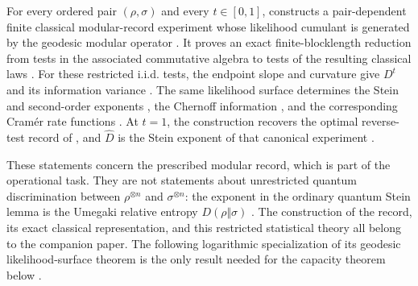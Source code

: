 \documentclass[11pt]{article}
\theoremstyle{remark}
\newcommand{\1}{\mathbbm{1}}
\begin{document}
For every ordered pair $(\rho,\sigma)$ and every $t\in[0,1]$, \cite{capel2026informationgeometry} constructs a pair-dependent finite classical
modular-record experiment whose likelihood cumulant is generated by
the geodesic modular operator
\cite[Theorem~3.1]{capel2026informationgeometry}.  It proves an exact
finite-blocklength reduction from tests in the associated commutative
algebra to tests of the resulting classical laws
\cite[Proposition~3.2]{capel2026informationgeometry}.  For these
restricted i.i.d. tests, the endpoint slope and curvature give
$D^t$ and its information variance
\cite[Proposition~3.3(i)]{capel2026informationgeometry}.  The same
likelihood surface determines the Stein and second-order exponents
\cite[Proposition~3.3(ii)]{capel2026informationgeometry}, the Chernoff
information \cite[Proposition~3.3(iii)]{capel2026informationgeometry},
and the corresponding Cram\'er rate functions
\cite[Proposition~3.3(iv)]{capel2026informationgeometry}.  At $t=1$, the
construction recovers the optimal reverse-test record of
\cite{matsumoto2010reverse}, and $\widehat D$ is the Stein exponent of
that canonical experiment
\cite[Section~3.1, Eqs.~(57)--(58), and Remark~3.4]{capel2026informationgeometry}.

These statements concern the prescribed modular record, which is part
of the operational task.  They are not statements about unrestricted
quantum discrimination between $\rho^{\otimes n}$ and
$\sigma^{\otimes n}$: the exponent in the ordinary quantum Stein lemma
is the Umegaki relative entropy $D(\rho\Vert\sigma)$
\cite{ogawa2000strong}.  The construction of the record, its exact
classical representation, and this restricted statistical theory all
belong to the companion paper.  The following logarithmic
specialization of its geodesic likelihood-surface theorem is the only
result needed for the capacity theorem below
\cite[Theorem~3.1]{capel2026informationgeometry}.
\end{document}
